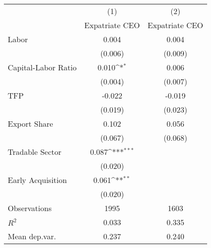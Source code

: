 {
\def\sym#1{\ifmmode^{#1}\else\(^{#1}\)\fi}
\begin{tabular}{l*{2}{c}}
\hline\hline
                    &\multicolumn{1}{c}{(1)}&\multicolumn{1}{c}{(2)}\\
                    &\multicolumn{1}{c}{Expatriate CEO}&\multicolumn{1}{c}{Expatriate CEO}\\
\hline
Labor               &       0.004         &       0.004         \\
                    &     (0.006)         &     (0.009)         \\
[1em]
Capital-Labor Ratio &       0.010\sym{*}  &       0.006         \\
                    &     (0.004)         &     (0.007)         \\
[1em]
TFP                 &      -0.022         &      -0.019         \\
                    &     (0.019)         &     (0.023)         \\
[1em]
Export Share        &       0.102         &       0.056         \\
                    &     (0.067)         &     (0.068)         \\
[1em]
Tradable Sector     &       0.087\sym{***}&                     \\
                    &     (0.020)         &                     \\
[1em]
Early Acquisition   &       0.061\sym{**} &                     \\
                    &     (0.020)         &                     \\
\hline
Observations        &        1995         &        1603         \\
\(R^{2}\)           &       0.033         &       0.335         \\
Mean dep.var.       &       0.237         &       0.240         \\
\hline\hline
\end{tabular}
}
